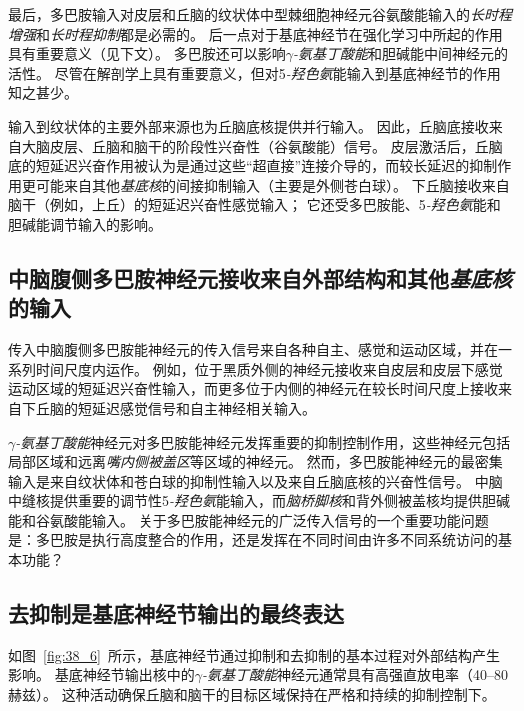 最后，多巴胺输入对皮层和丘脑的纹状体中型棘细胞神经元谷氨酸能输入的\textit{长时程增强}和\textit{长时程抑制}都是必需的。
后一点对于基底神经节在强化学习中所起的作用具有重要意义（见下文）。
多巴胺还可以影响\textit{$\gamma$-氨基丁酸能}和胆碱能中间神经元的活性。
尽管在解剖学上具有重要意义，但对5\textit{-羟色氨}能输入到基底神经节的作用知之甚少。


输入到纹状体的主要外部来源也为丘脑底核提供并行输入。
因此，丘脑底接收来自大脑皮层、丘脑和脑干的阶段性兴奋性（谷氨酸能）信号。
皮层激活后，丘脑底的短延迟兴奋作用被认为是通过这些“超直接”连接介导的，而较长延迟的抑制作用更可能来自其他\textit{基底核}的间接抑制输入（主要是外侧苍白球）。
下丘脑接收来自脑干（例如，上丘）的短延迟兴奋性感觉输入；
它还受多巴胺能、5\textit{-羟色氨}能和胆碱能调节输入的影响。



\subsection{中脑腹侧多巴胺神经元接收来自外部结构和其他\textit{基底核}的输入}

传入中脑腹侧多巴胺能神经元的传入信号来自各种自主、感觉和运动区域，并在一系列时间尺度内运作。
例如，位于黑质外侧的神经元接收来自皮层和皮层下感觉运动区域的短延迟兴奋性输入，而更多位于内侧的神经元在较长时间尺度上接收来自下丘脑的短延迟感觉信号和自主神经相关输入。


\textit{$\gamma$-氨基丁酸能}神经元对多巴胺能神经元发挥重要的抑制控制作用，这些神经元包括局部区域和远离\textit{嘴内侧被盖区}等区域的神经元。
然而，多巴胺能神经元的最密集输入是来自纹状体和苍白球的抑制性输入以及来自丘脑底核的兴奋性信号。
中脑中缝核提供重要的调节性5\textit{-羟色氨}能输入，而\textit{脑桥脚核}和背外侧被盖核均提供胆碱能和谷氨酸能输入。
关于多巴胺能神经元的广泛传入信号的一个重要功能问题是：多巴胺是执行高度整合的作用，还是发挥在不同时间由许多不同系统访问的基本功能？



\subsection{去抑制是基底神经节输出的最终表达}

如图~\ref{fig:38_6}~所示，基底神经节通过抑制和去抑制的基本过程对外部结构产生影响。
基底神经节输出核中的\textit{$\gamma$-氨基丁酸能}神经元通常具有高强直放电率（40–80 赫兹）。
这种活动确保丘脑和脑干的目标区域保持在严格和持续的抑制控制下。


